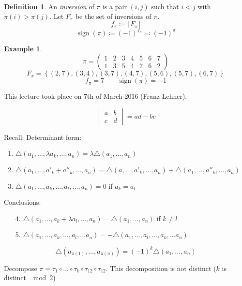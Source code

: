 \documentclass[a4paper,landscape,twocolumn]{article}
\newcommand\meta[3]{This #1 took place on #2 (#3).\par}
\newcommand\set[1]{\left\{#1\right\}}
\newcommand\card[1]{\left|\,#1\,\right|}
\theoremstyle{definition}
\newtheorem{defi}{Definition}
\newtheorem{ex}{Example}
\begin{document}
\begin{defi}
  \label{def-7.14}
  An \emph{inversion} of $\pi$ is a pair $(i,j)$ such that
  $i < j$ with $\pi(i) > \pi(j)$.
  Let $F_\pi$ be the set of inversions of $\pi$.
  \[ f_{\pi} \coloneqq \card{F_\pi} \]
  \[ \operatorname{sign}(\pi) \coloneqq (-1)^{f_\pi} \eqqcolon (-1)^\pi \]
\end{defi}

\begin{ex}
  \label{example-7.15}
  \[
    \pi = \begin{pmatrix}
      1 & 2 & 3 & 4 & 5 & 6 & 7 \\
      1 & 3 & 5 & 4 & 7 & 6 & 2
    \end{pmatrix}
  \] \[
    F_\pi = \set{(2,7), (3,4), (3,7), (4,7), (5,6), (5,7), (6,7)}
  \]
  \[ f_\pi = 7 \qquad \operatorname{sign}(\pi) = -1 \]
\end{ex}

\meta{lecture}{7th of March 2016}{Franz Lehner}

\[
  \begin{vmatrix}
    a & b \\
    c & d
  \end{vmatrix}
  = ad - bc
\]

Recall: Determinant form:
\begin{enumerate}
  \item $\triangle(a_1, \ldots, \lambda a_k, \ldots, a_n) = \lambda \triangle (a_1, \ldots, a_n)$
  \item $\triangle(a_1, \ldots, a'_k + a''_k, \ldots, a_n) = \triangle(a, \ldots, a'_k, \ldots, a_n) + \triangle(a_1, \ldots, a''_k, \ldots, a_n)$
  \item $\triangle(a_1, \ldots, a_k, \ldots, a_l, \ldots, a_n) = 0$ if $a_k = a_l$
\end{enumerate}
Conclusions:
\begin{enumerate}
  \item[4.] $\triangle (a_1, \ldots, a_k + \lambda a_l, \ldots, a_n) = \triangle (a_1, \ldots, a_n)$ if $k \neq l$
  \item[5.] $\triangle (a_1, \ldots, a_k, \ldots, a_l, \ldots a_n) = -\triangle (a_1, \ldots, a_l, \ldots, a_k, \ldots a_n)$
\end{enumerate}

\[ \triangle (a_{\pi(1)}, \ldots, a_{\pi(n)}) = (-1)^k \triangle (a_1, \ldots, a_n) \]

Decompose $\pi = \tau_1 \circ \ldots \circ \tau_k \circ \tau_{12} \circ \tau_{12}$.
This decomposition is not distinct ($k$ is distinct $\mod 2$)
\end{document}
